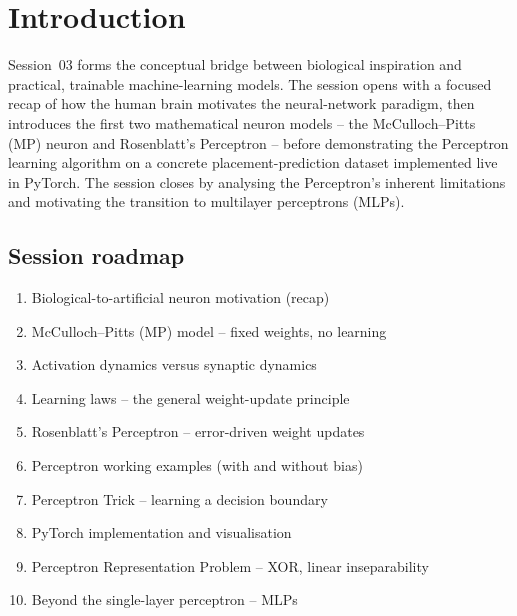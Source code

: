 \documentclass[12pt,a4paper]{article}
\begin{document}
\tableofcontents
\newpage

\section{Introduction}
\label{sec:intro}

Session~03 forms the conceptual bridge between biological inspiration
and practical, trainable machine-learning models.
The session opens with a focused recap of how the human brain motivates
the neural-network paradigm, then introduces the first two mathematical
neuron models -- the McCulloch--Pitts (MP) neuron and Rosenblatt's
Perceptron -- before demonstrating the Perceptron learning algorithm
on a concrete placement-prediction dataset implemented live in PyTorch.
The session closes by analysing the Perceptron's inherent limitations
and motivating the transition to multilayer perceptrons (MLPs).

\subsection*{Session roadmap}

\begin{enumerate}[label=\textbf{\arabic*.}]
  \item Biological-to-artificial neuron motivation (recap)
  \item McCulloch--Pitts (MP) model -- fixed weights, no learning
  \item Activation dynamics versus synaptic dynamics
  \item Learning laws -- the general weight-update principle
  \item Rosenblatt's Perceptron -- error-driven weight updates
  \item Perceptron working examples (with and without bias)
  \item Perceptron Trick -- learning a decision boundary
  \item PyTorch implementation and visualisation
  \item Perceptron Representation Problem -- XOR, linear inseparability
  \item Beyond the single-layer perceptron -- MLPs
\end{enumerate}
\end{document}
